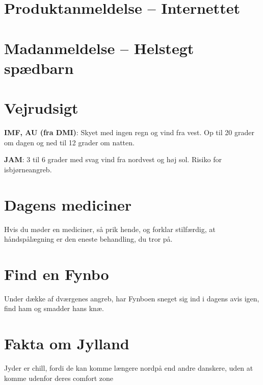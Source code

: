 

\begin{minipage}[b]{0.95\linewidth}
\begin{minipage}[t]{0.47\textwidth}
\vspace{3mm}
\section*{Produktanmeldelse -- Internettet}


\vspace{1mm}
\section*{Madanmeldelse -- Helstegt spædbarn}
\vspace{2mm}

\end{minipage}%
\hfill\begin{minipage}[t]{0.47\textwidth}
\vspace{3mm}
\section*{Vejrudsigt}
\textbf{IMF, AU (fra DMI)}: Skyet med ingen regn og vind fra vest. Op til 20 grader om dagen og ned til 12 grader om natten.

\textbf{JAM}: 3 til 6 grader med svag vind fra nordvest og høj sol. Risiko for isbjørneangreb.

\vspace{-2mm}
\section*{Dagens mediciner}
Hvis du møder en mediciner, så prik hende, og forklar stilfærdig, at håndspålægning er den eneste behandling, du tror på.

\vspace{-2mm}
\section*{Find en Fynbo}
Under dække af dværgenes angreb, har Fynboen sneget sig ind i dagens avis igen, find ham og smadder hans knæ.

\vspace{-2mm}
\section*{Fakta om Jylland}
Jyder er chill, fordi de kan komme længere nordpå end andre danskere, uden at komme udenfor deres comfort zone


\end{minipage}
\end{minipage}
